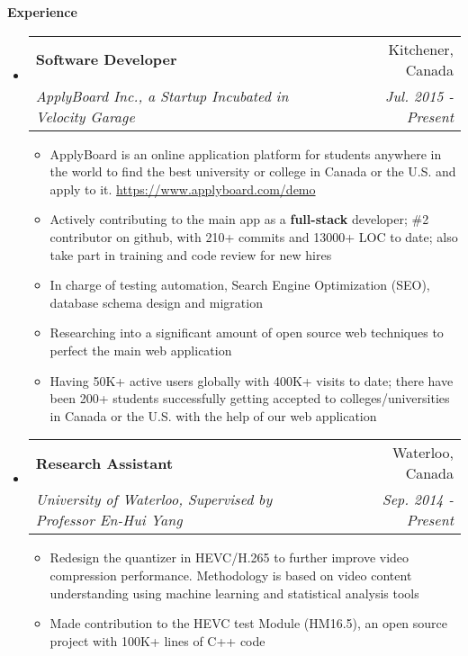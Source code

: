 \documentclass[letterpaper,10pt]{article}
\makeatletter
\newcommand{\resitem}[1]{\item #1 \vspace{-2pt}}
\newcommand{\resheading}[1]{{\large \colorbox{mygrey}{\begin{minipage}{\textwidth}{\textbf{#1 \vphantom{p\^{E}}}}\end{minipage}}}}
\newcommand{\ressubheading}[4]{
\begin{tabular*}{7.0in}{l@{\extracolsep{\fill}}r}
		\textbf{#1} & #2 \\
		\textit{#3} & \textit{#4} \\
\end{tabular*}\vspace{-6pt}}
\makeatother
\begin{document}
\resheading{Experience}
\begin{itemize}
\itemsep0em
\item
    \ressubheading{Software Developer}{Kitchener, Canada}{ApplyBoard Inc., a Startup Incubated in Velocity Garage}{ Jul. 2015 - Present}
	\begin{itemize}
		\resitem{ApplyBoard is an online application platform for students anywhere in the world to find the best university or college in Canada or the U.S. and apply to it. \url{https://www.applyboard.com/demo} }
        \resitem{Actively contributing to the main app as a \textbf{full-stack} developer; \#2 contributor on github, with 210+ commits and 13000+ LOC to date; also take part in training and code review for new hires}
		\resitem{In charge of testing automation, Search Engine Optimization (SEO), database schema design and migration}
		\resitem{Researching into a significant amount of open source web techniques to perfect the main web application}
        \resitem{Having 50K+ active users globally with 400K+ visits to date; there have been 200+ students successfully getting accepted to colleges/universities in Canada or the U.S. with the help of our web application }
	\end{itemize}
\item
	\ressubheading{Research Assistant}{Waterloo, Canada}{University of Waterloo, Supervised by Professor En-Hui Yang}{Sep. 2014 - Present}
	\begin{itemize}
		\resitem{Redesign the quantizer in HEVC/H.265 to further improve video compression performance. Methodology is based on video content understanding using machine learning and statistical analysis tools}
		\resitem{Made contribution to the HEVC test Module (HM16.5), an open source project with 100K+ lines of C++ code}
	\end{itemize}
\end{itemize}
\end{document}
